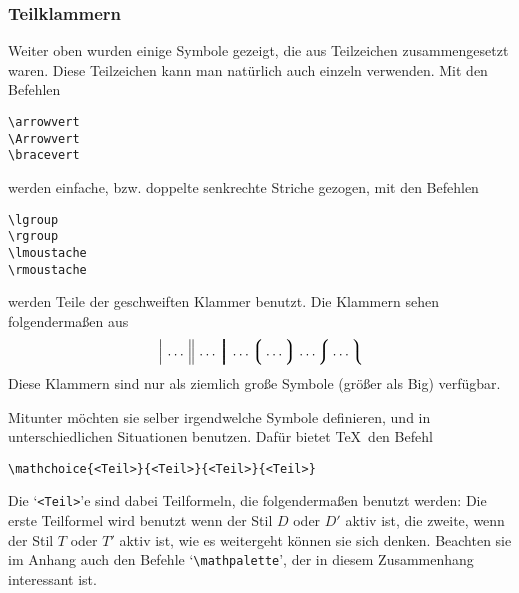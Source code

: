 \subsubsection{Teilklammern}
Weiter oben wurden einige Symbole gezeigt, die aus Teilzeichen
zusammengesetzt waren. Diese Teilzeichen kann man nat\"urlich auch
einzeln verwenden. Mit den Befehlen
\begin{verbatim}
\arrowvert
\Arrowvert
\bracevert
\end{verbatim}
werden einfache, bzw. 
doppelte senkrechte Striche gezogen, mit den
Befehlen
\begin{verbatim}
\lgroup
\rgroup
\lmoustache
\rmoustache
\end{verbatim}
werden Teile der geschweiften Klammer benutzt. Die Klammern sehen
folgenderma\ss{}en aus
$$\Big\arrowvert\ldots\Big\Arrowvert\ldots\Big\bracevert
\ldots\Big\lgroup\ldots\Big\rgroup\ldots\Big\lmoustache
\ldots\Big\rmoustache$$
Diese Klammern sind nur als ziemlich gro\ss{}e Symbole (gr\"o\ss{}er als Big)
verf\"ugbar.

Mitunter m\"ochten sie selber irgendwelche Symbole definieren, und in
unterschiedlichen Situationen benutzen. Daf\"ur bietet \TeX\ den Befehl
\begin{verbatim}
\mathchoice{<Teil>}{<Teil>}{<Teil>}{<Teil>}
\end{verbatim}
Die `\verb|<Teil>|'e sind dabei Teilformeln, die folgenderma\ss{}en
benutzt werden: Die erste Teilformel wird benutzt wenn der Stil $D$
oder $D'$ 
aktiv ist, die zweite, wenn der Stil $T$ oder $T'$ aktiv
ist, wie es weitergeht k\"onnen sie sich denken. Beachten sie im Anhang
auch den Befehle 
`\verb|\mathpalette|', der in diesem Zusammenhang
interessant ist.
